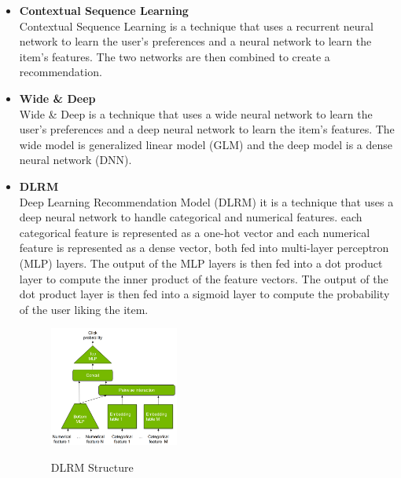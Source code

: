 \begin{itemize}
\begin{figure}[H]
    \end{figure}
    \item \textbf{Contextual Sequence Learning}\\Contextual Sequence Learning is a technique that uses a recurrent neural network to learn the user's preferences and a neural network to learn the item's features. The two networks are then combined to create a recommendation.
    \item \textbf{Wide & Deep}\\Wide \& Deep is a technique that uses a wide neural network to learn the user's preferences and a deep neural network to learn the item's features. The wide model is generalized linear model (GLM) and the deep model is a dense neural network (DNN).
    \item \textbf{DLRM}\\Deep Learning Recommendation Model (DLRM) it is a technique that uses a deep neural network to handle categorical and numerical features. each categorical feature is represented as a one-hot vector and each numerical feature is represented as a dense vector, both fed into multi-layer perceptron (MLP) layers. The output of the MLP layers is then fed into a dot product layer to compute the inner product of the feature vectors. The output of the dot product layer is then fed into a sigmoid layer to compute the probability of the user liking the item.
    \begin{figure}[H]
        \centering
        \includegraphics[width=0.4\textwidth]{assets/dlrm.png}
        \caption{DLRM Structure}
        \label{fig:dlrm}
        \cite{NvidiaRecSys}
    \end{figure}
\end{itemize}